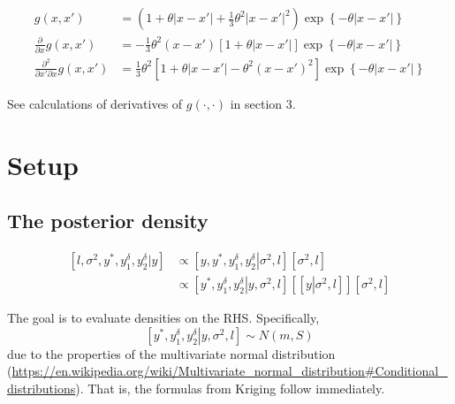 \documentclass[12pt]{amsart}
\begin{document}
\begin{align}
g\left( {x,x'} \right) &= \left( {1 + \theta \left| {x - x'} \right| + \frac{1}{3}{\theta ^2}{{\left| {x - x'} \right|}^2}} \right)\exp \left\{ { - \theta \left| {x - x'} \right|} \right\}\\
\frac{\partial }{{\partial x}}g\left( {x,x'} \right) &=  - \frac{1}{3}{\theta ^2}\left( {x - x'} \right)\left[ {1 + \theta \left| {x - x'} \right|} \right]\exp \left\{ { - \theta \left| {x - x'} \right|} \right\}\\
\frac{{{\partial ^2}}}{{\partial x'\partial x}}g\left( {x,x'} \right) &= \frac{1}{3}{\theta ^2}\left[ {1 + \theta \left| {x - x'} \right| - {\theta ^2}{{\left( {x - x'} \right)}^2}} \right]\exp \left\{ { - \theta \left| {x - x'} \right|} \right\}
\end{align}
    
See calculations of derivatives of $g(\cdot, \cdot)$ in section 3.

\bigskip
\section{Setup}
\subsection{The posterior density}
\begin{align}
\left[ {l,{\sigma ^2},{y^*},y_1^\delta ,y_2^\delta \left| y \right.} \right] &\propto \left[ {y,{y^*},y_1^\delta ,y_2^\delta \left| {{\sigma ^2},l} \right.} \right]\left[ {{\sigma ^2},l} \right]\\
 &\propto \left[ {{y^*},y_1^\delta ,y_2^\delta \left| {y,{\sigma ^2},l} \right.} \right]\left[ {\left[ {y\left| {{\sigma ^2},l} \right.} \right]} \right]\left[ {{\sigma ^2},l} \right]
\end{align}
      
The goal is to evaluate densities on the RHS. Specifically, 
\[\left[ {{y^*},y_1^\delta ,y_2^\delta \left| {y,{\sigma ^2},l} \right.} \right] \sim N\left( {m,S} \right)\]
due to the properties of the multivariate normal distribution (\url{https://en.wikipedia.org/wiki/Multivariate_normal_distribution#Conditional_distributions}). 
That is, the formulas from Kriging follow immediately.\\
\end{document}
